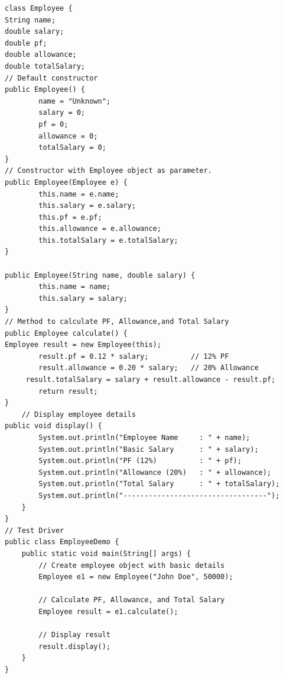 \begin{verbatim}
class Employee {
String name;
double salary;
double pf;
double allowance;
double totalSalary;
// Default constructor
public Employee() {
        name = "Unknown";
        salary = 0;
        pf = 0;
        allowance = 0;
        totalSalary = 0;
}
// Constructor with Employee object as parameter. 
public Employee(Employee e) {
        this.name = e.name;
        this.salary = e.salary;
        this.pf = e.pf;
        this.allowance = e.allowance;
        this.totalSalary = e.totalSalary;
}

public Employee(String name, double salary) {
        this.name = name;
        this.salary = salary;
}
// Method to calculate PF, Allowance,and Total Salary
public Employee calculate() {
Employee result = new Employee(this); 
        result.pf = 0.12 * salary;          // 12% PF
        result.allowance = 0.20 * salary;   // 20% Allowance
     result.totalSalary = salary + result.allowance - result.pf;
        return result;
}
    // Display employee details
public void display() {
        System.out.println("Employee Name     : " + name);
        System.out.println("Basic Salary      : " + salary);
        System.out.println("PF (12%)          : " + pf);
        System.out.println("Allowance (20%)   : " + allowance);
        System.out.println("Total Salary      : " + totalSalary);
        System.out.println("----------------------------------");
    }
}
// Test Driver
public class EmployeeDemo {
    public static void main(String[] args) {
        // Create employee object with basic details
        Employee e1 = new Employee("John Doe", 50000);

        // Calculate PF, Allowance, and Total Salary
        Employee result = e1.calculate();

        // Display result
        result.display();
    }
}

\end{verbatim}